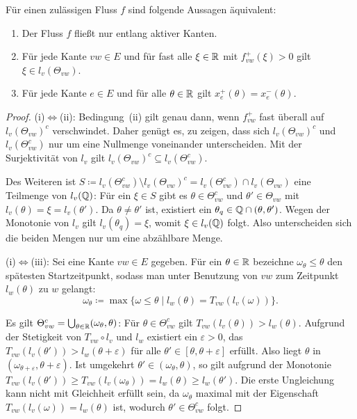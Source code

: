 \begin{lemma}\label{lemma-only-active-edges}
	Für einen zulässigen Fluss $f$ sind folgende Aussagen äquivalent:
	\begin{enumerate}[label=(\roman*)]
		\item Der Fluss $f$ fließt nur entlang aktiver Kanten.
		\item Für jede Kante $vw\in E$ und für fast alle $\xi\in\mathbb{R}$ mit	$f_{vw}^+(\xi)>0$ gilt $\xi \in l_v(\Theta_{vw})$.
		\item Für jede Kante $e\in E$ und für alle $\theta\in\mathbb{R}$ gilt $x_e^+(\theta) = x_e^-(\theta)$.
	\end{enumerate}
\end{lemma}
\begin{proof}
	(i)$\Leftrightarrow$(ii): Bedingung~(ii) gilt genau dann, wenn $f_{vw}^+$ fast überall auf $l_v(\Theta_{vw})^c$ verschwindet.
	Daher genügt es, zu zeigen, dass sich $l_v(\Theta_{vw})^c$ und $l_v(\Theta_{vw}^c)$ nur um eine Nullmenge voneinander unterscheiden.
	Mit der Surjektivität von $l_v$ gilt $l_v(\Theta_{vw})^c\subseteq l_v(\Theta_{vw}^c)$.
	
	Des Weiteren ist $S\coloneq l_v(\Theta_{vw}^c)\setminus l_v(\Theta_{vw})^c = l_v(\Theta_{vw}^c)\cap l_v(\Theta_{vw})$ eine Teilmenge von $l_v(\mathbb{Q})$:
	Für ein $\xi\in S$ gibt es $\theta\in\Theta_{vw}^c$ und $\theta'\in\Theta_{vw}$ mit $l_v(\theta)=\xi=l_v(\theta')$.
	Da $\theta\neq\theta'$ ist, existiert ein $\theta_q\in\mathbb{Q}\cap(\theta,\theta')$.
	Wegen der Monotonie von $l_v$ gilt $l_v(\theta_q)=\xi$, womit $\xi\in l_v(\mathbb{Q})$ folgt.
	Also unterscheiden sich die beiden Mengen nur um eine abzählbare Menge.
	
	(i)$\Leftrightarrow$(iii): Sei eine Kante $vw\in E$ gegeben.
	Für ein $\theta\in\mathbb{R}$ bezeichne $\omega_\theta\leq \theta$ den spätesten Startzeitpunkt, sodass man unter Benutzung von $vw$ zum Zeitpunkt $l_w(\theta)$ zu $w$ gelangt:
	\[ \omega_\theta\coloneq \max\{ \omega\leq\theta \mid l_w(\theta) = T_{vw}(l_v(\omega)) \}. \]
	
	Es gilt $\Theta_{vw}^c = \bigcup_{\theta\in\mathbb{R}} (\omega_\theta, \theta)$:
	Für $\theta\in\Theta_{vw}^c$ gilt $T_{vw}(l_v(\theta)) > l_w(\theta)$.
	Aufgrund der Stetigkeit von $T_{vw}\circ l_v$ und $l_w$ existiert ein $\varepsilon>0$, das $T_{vw}(l_v(\theta')) > l_w(\theta+\varepsilon)$ für alle $\theta'\in[\theta,\theta+\varepsilon]$ erfüllt.
	Also liegt $\theta$ in $(\omega_{\theta+\varepsilon}, \theta+\varepsilon)$.
	Ist umgekehrt $\theta'\in (\omega_\theta,\theta)$, so gilt aufgrund der Monotonie $T_{vw}(l_v(\theta'))\geq T_{vw}(l_v(\omega_\theta)) = l_w(\theta)\geq l_w(\theta')$.
	Die erste Ungleichung kann nicht mit Gleichheit erfüllt sein, da $\omega_\theta$ maximal mit der Eigenschaft $T_{vw}(l_v(\omega)) = l_w(\theta)$ ist, wodurch $\theta'\in\Theta_{vw}^c$ folgt.
	

\end{proof}
